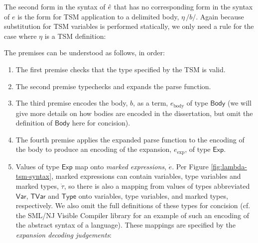 {The second form in the syntax of $\ue$ that has no corresponding form in the syntax of $e$ is the form for TSM application to a delimited body, $\eta\,\texttt{/}b\texttt{/}$. Again because substitution for TSM variables is performed statically, we only need a rule for the case where $\eta$ is a TSM definition:
\begin{mathpar}
\end{mathpar}
The premises can be understood as follows, in order:
\begin{enumerate}
\item The first premise checks that the type specified by the TSM is valid.
\item The second premise typechecks and expands the parse function.
\item The third premise encodes the body, $b$, as a term, $e_\text{body}$ of type $\mathsf{Body}$ (we will give more details on how bodies are encoded in the dissertation, but omit the definition of $\mathsf{Body}$ here for concision).
\item The fourth premise applies the expanded parse function to the encoding of the body to produce an encoding of the expansion, $e_\text{exp}$, of  type $\mathsf{Exp}$. 
\item Values of type $\mathsf{Exp}$ map onto \emph{marked expressions}, $\dot{e}$. Per Figure \ref{fig:lambda-tsm-syntax}, marked expressions can contain variables, type variables and marked types, $\dot{\tau}$, so there is also a mapping from values of types abbreviated $\mathsf{Var}$, $\mathsf{TVar}$ and $\mathsf{Type}$ onto variables, type variables, and {marked types}, respectively. We also omit the full definitions of these types for concision (cf. the SML/NJ Visible Compiler library \cite{SML/VisibleCompiler} for an example of such an encoding of the abstract syntax of a language). These mappings are specified by the \emph{expansion decoding judgements}:


\end{enumerate}}
